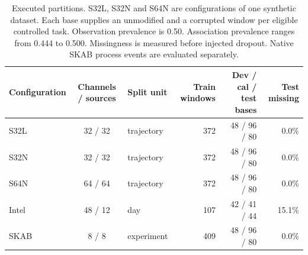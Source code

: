 \begin{table}[t]
\centering\small
\caption{Executed partitions. S32L, S32N and S64N are configurations of one synthetic dataset. Each base supplies an unmodified and a corrupted window per eligible controlled task. Observation prevalence is 0.50. Association prevalence ranges from 0.444 to 0.500. Missingness is measured before injected dropout. Native SKAB process events are evaluated separately.}\label{tab:data}
\begin{tabular}{lclrrr}
\toprule
Configuration & Channels / sources & Split unit & Train windows & Dev / cal / test bases & Test missing \\
\midrule
S32L & 32 / 32 & trajectory & 372 & 48 / 96 / 80 & 0.0\% \\
S32N & 32 / 32 & trajectory & 372 & 48 / 96 / 80 & 0.0\% \\
S64N & 64 / 64 & trajectory & 372 & 48 / 96 / 80 & 0.0\% \\
Intel & 48 / 12 & day & 107 & 42 / 41 / 44 & 15.1\% \\
SKAB & 8 / 8 & experiment & 409 & 48 / 96 / 80 & 0.0\% \\
\bottomrule
\end{tabular}
\end{table}
